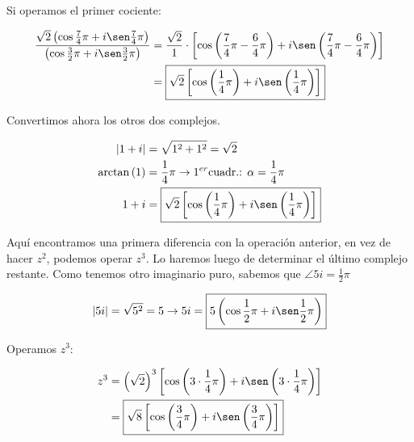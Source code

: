 \documentclass[12pt]{article}
\begin{document}
Si operamos el primer cociente:

\begin{align*}
    \frac{\sqrt{2}\left(\cos \frac{7}{4}\pi + i \sen \frac{7}{4} \pi\right)}{\left(\cos \frac{3}{2}\pi + i \sen \frac{3}{2} \pi\right)} & = \frac{\sqrt{2}}{1} \cdot \left[\cos \left(\frac{7}{4}\pi - \frac{6}{4}\pi\right) + i \sen \left(\frac{7}{4}\pi - \frac{6}{4}\pi\right)\right] \\
                                                                                                                                        & = \boxed{\sqrt{2} \left[\cos \left(\frac{1}{4}\pi\right) + i \sen \left(\frac{1}{4}\pi\right)\right]}                                           \\
\end{align*}

Convertimos ahora los otros dos complejos.

\begin{align*}
    |1 + i|                & = \sqrt{1^2 + 1^2} = \sqrt{2}                                                                         \\
    \arctan \left(1\right) & = \frac{1}{4}\pi \rightarrow 1^{er} \text{cuadr.: } \alpha = \frac{1}{4}\pi                           \\
    1 + i                  & = \boxed{\sqrt{2} \left[\cos \left(\frac{1}{4}\pi\right) + i \sen \left(\frac{1}{4}\pi\right)\right]} \\
\end{align*}

Aquí encontramos una primera diferencia con la operación anterior, en vez de hacer \(z^2\),
podemos operar \(z^3\). Lo haremos luego de determinar el último complejo restante.
Como tenemos otro imaginario puro, sabemos que \(\angle 5i = \frac{1}{2}\pi\)

\begin{align*}
    |5i| = \sqrt{5^2} = 5 \rightarrow 5i = \boxed{5\left(\cos \frac{1}{2}\pi + i \sen \frac{1}{2} \pi\right)} \\
\end{align*}

Operamos \(z^3\):

\begin{align*}
    z^3 & = \left(\sqrt{2}\right)^{3} \left[\cos \left(3 \cdot \frac{1}{4}\pi\right) + i \sen \left(3 \cdot \frac{1}{4}\pi\right)\right] \\
        & = \boxed{\sqrt{8} \left[\cos \left(\frac{3}{4}\pi\right) + i \sen \left(\frac{3}{4}\pi\right)\right]}                          \\
\end{align*}
\end{document}
